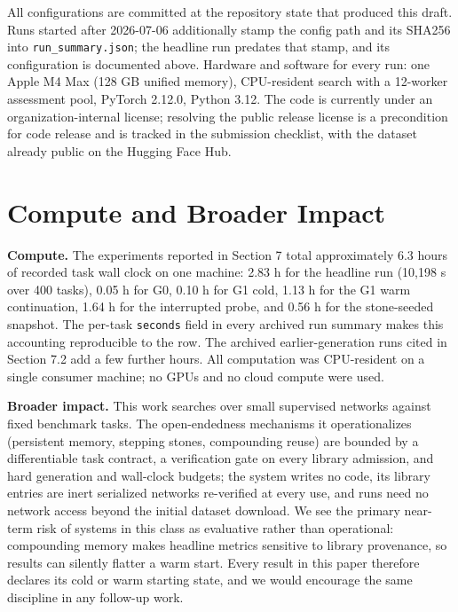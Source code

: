 \documentclass[11pt]{article}
\begin{document}
All configurations are committed at the repository state that produced this draft. Runs started after 2026-07-06 additionally stamp the config path and its SHA256 into \texttt{run_summary.json}; the headline run predates that stamp, and its configuration is documented above. Hardware and software for every run: one Apple M4 Max (128 GB unified memory), CPU-resident search with a 12-worker assessment pool, PyTorch 2.12.0, Python 3.12. The code is currently under an organization-internal license; resolving the public release license is a precondition for code release and is tracked in the submission checklist, with the dataset already public on the Hugging Face Hub.

\section{Compute and Broader Impact}

\textbf{Compute.} The experiments reported in Section 7 total approximately 6.3 hours of recorded task wall clock on one machine: 2.83 h for the headline run (10,198 s over 400 tasks), 0.05 h for G0, 0.10 h for G1 cold, 1.13 h for the G1 warm continuation, 1.64 h for the interrupted probe, and 0.56 h for the stone-seeded snapshot. The per-task \texttt{seconds} field in every archived run summary makes this accounting reproducible to the row. The archived earlier-generation runs cited in Section 7.2 add a few further hours. All computation was CPU-resident on a single consumer machine; no GPUs and no cloud compute were used.

\textbf{Broader impact.} This work searches over small supervised networks against fixed benchmark tasks. The open-endedness mechanisms it operationalizes (persistent memory, stepping stones, compounding reuse) are bounded by a differentiable task contract, a verification gate on every library admission, and hard generation and wall-clock budgets; the system writes no code, its library entries are inert serialized networks re-verified at every use, and runs need no network access beyond the initial dataset download. We see the primary near-term risk of systems in this class as evaluative rather than operational: compounding memory makes headline metrics sensitive to library provenance, so results can silently flatter a warm start. Every result in this paper therefore declares its cold or warm starting state, and we would encourage the same discipline in any follow-up work.


\end{document}
